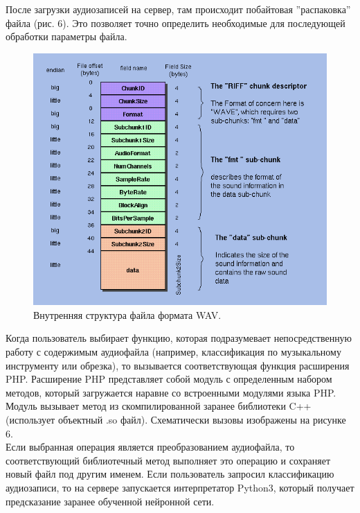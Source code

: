 \documentclass[14pt,a4paper]{article}
\begin{document}
После загрузки аудиозаписей на сервер, там происходит побайтовая ''распаковка'' файла (рис. 6). Это позволяет точно определить необходимые для последующей обработки параметры файла.

\begin{figure}[H]
\centering
\includegraphics[scale=0.5]{img/wave_format.png}
\caption{Внутренняя структура файла формата WAV.}
\label{fig:wave_format}
\end{figure}

Когда пользователь выбирает функцию, которая подразумевает непосредственную работу с содержимым аудиофайла (например, классификация по музыкальному инструменту или обрезка), то вызывается соответствующая функция расширения PHP. Расширение PHP представляет собой модуль с определенным набором методов, который загружается наравне со встроенными модулями языка PHP. Модуль вызывает метод из скомпилированной заранее библиотеки C++ (использует объектный .so файл). Схематически вызовы изображены на рисунке 6. \\

Если выбранная операция является преобразованием аудиофайла, то соответствующий библиотечный метод выполняет это операцию и сохраняет новый файл под другим именем. Если пользователь запросил классификацию аудиозаписи, то на сервере запускается интерпретатор Python3, который получает предсказание заранее обученной нейронной сети. \\
\end{document}
